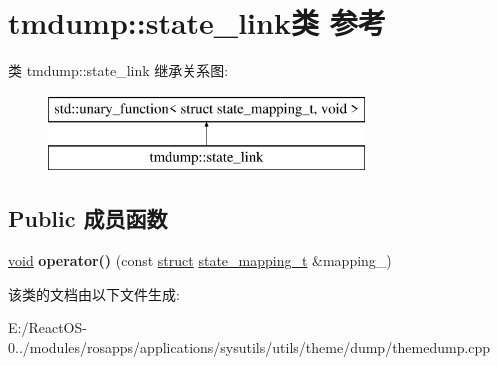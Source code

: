 \hypertarget{classtmdump_1_1state__link}{}\section{tmdump\+:\+:state\+\_\+link类 参考}
\label{classtmdump_1_1state__link}
类 tmdump\+:\+:state\+\_\+link 继承关系图\+:\begin{figure}[H]
\begin{center}
\leavevmode
\includegraphics[height=2.000000cm]{classtmdump_1_1state__link}
\end{center}
\end{figure}
\subsection*{Public 成员函数}
\begin{DoxyCompactItemize}
\item 
\mbox{\label{classtmdump_1_1state__link_a52ee364b9b53cd3a04c1f321e091e89f}} 
\hyperlink{interfacevoid}{void} {\bfseries operator()} (const \hyperlink{interfacestruct}{struct} \hyperlink{structtmdump_1_1state__mapping__t}{state\+\_\+mapping\+\_\+t} \&mapping\+\_\+)
\end{DoxyCompactItemize}


该类的文档由以下文件生成\+:\begin{DoxyCompactItemize}
\item 
E\+:/\+React\+O\+S-\/0../modules/rosapps/applications/sysutils/utils/theme/dump/themedump.\+cpp\end{DoxyCompactItemize}
